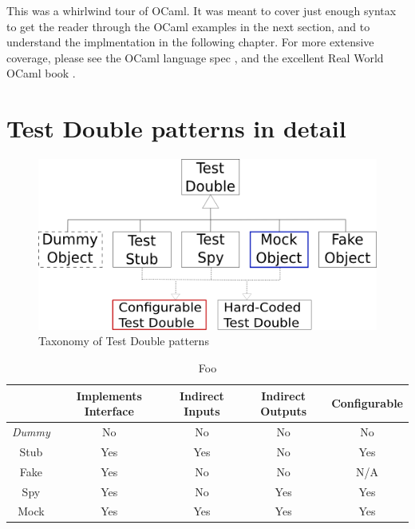 This was a whirlwind tour of OCaml. It was meant to cover just enough
syntax to get the reader through the OCaml examples in the next
section, and to understand the implmentation in the following
chapter. For more extensive coverage, please see the OCaml language
spec \cite{ocaml:spec}, and the excellent Real World OCaml book
\cite{rwo}.

\section{Test Double patterns in detail}
\label{testdoubles}

\begin{figure}
  \centering
  \includegraphics[scale=0.7]{img/test_double_taxonomy.png}
  \caption[Taxonomy of Test Double patterns]{Taxonomy of Test Double patterns\footnotemark}
  \label{fig:taxonomy}
\end{figure}


\begin{table}
  \centering
  \begin{tabular}{c|c|c|c|c}
    & Implements Interface
    & Indirect Inputs
    & Indirect Outputs
    & Configurable
    \\ \hline
    \textit{Dummy} & No & No & No & No \\ \hline
    Stub & Yes & Yes & No & Yes        \\ \hline
    Fake & Yes & No & No & N/A         \\ \hline
    Spy & Yes & No & Yes & Yes         \\ \hline
    Mock & Yes & Yes & Yes & Yes       \\ \hline
  \end{tabular}
  \caption{Foo}
  \label{table:testdoubles}
\end{table}

